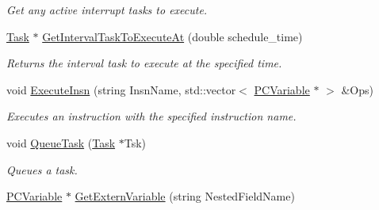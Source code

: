 \begin{DoxyCompactItemize}
\begin{DoxyCompactList}\small\item\em Get any active interrupt tasks to execute. \end{DoxyCompactList}\item 
\hyperlink{classpc__emulator_1_1Task}{Task} $\ast$ \hyperlink{classpc__emulator_1_1PCResourceImpl_a72898a5dd446e142f7e5cea6ce469486}{Get\+Interval\+Task\+To\+Execute\+At} (double schedule\+\_\+time)\hypertarget{classpc__emulator_1_1PCResourceImpl_a72898a5dd446e142f7e5cea6ce469486}{}\label{classpc__emulator_1_1PCResourceImpl_a72898a5dd446e142f7e5cea6ce469486}

\begin{DoxyCompactList}\small\item\em Returns the interval task to execute at the specified time. \end{DoxyCompactList}\item 
void \hyperlink{classpc__emulator_1_1PCResourceImpl_aa9579c9b7c93966abbfd167e5b00d412}{Execute\+Insn} (string Insn\+Name, std\+::vector$<$ \hyperlink{classpc__emulator_1_1PCVariable}{P\+C\+Variable} $\ast$ $>$ \&Ops)
\begin{DoxyCompactList}\small\item\em Executes an instruction with the specified instruction name. \end{DoxyCompactList}\item 
void \hyperlink{classpc__emulator_1_1PCResourceImpl_ab64a9dd6676b818413edc2b690dee265}{Queue\+Task} (\hyperlink{classpc__emulator_1_1Task}{Task} $\ast$Tsk)\hypertarget{classpc__emulator_1_1PCResourceImpl_ab64a9dd6676b818413edc2b690dee265}{}\label{classpc__emulator_1_1PCResourceImpl_ab64a9dd6676b818413edc2b690dee265}

\begin{DoxyCompactList}\small\item\em Queues a task. \end{DoxyCompactList}\item 
\hyperlink{classpc__emulator_1_1PCVariable}{P\+C\+Variable} $\ast$ \hyperlink{classpc__emulator_1_1PCResourceImpl_ae078d93dc866fc2deba248a7c0e1a573}{Get\+Extern\+Variable} (string Nested\+Field\+Name)\hypertarget{classpc__emulator_1_1PCResourceImpl_ae078d93dc866fc2deba248a7c0e1a573}{}\label{classpc__emulator_1_1PCResourceImpl_ae078d93dc866fc2deba248a7c0e1a573}


\end{DoxyCompactItemize}
